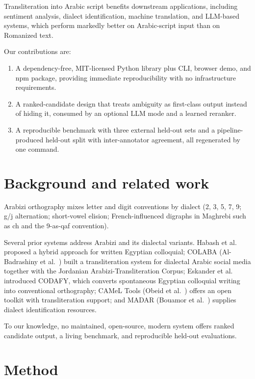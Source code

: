 \documentclass[11pt]{article}
\begin{document}
Transliteration into Arabic script benefits downstream applications,
including sentiment analysis, dialect identification, machine
translation, and LLM-based systems, which perform markedly better on
Arabic-script input than on Romanized text.

Our contributions are:

\begin{enumerate}
  \item A dependency-free, MIT-licensed Python library plus CLI, browser
        demo, and npm package, providing immediate reproducibility with
        no infrastructure requirements.
  \item A ranked-candidate design that treats ambiguity as first-class
        output instead of hiding it, consumed by an optional LLM mode and
        a learned reranker.
  \item A reproducible benchmark with three external held-out sets and a
        pipeline-produced held-out split with inter-annotator agreement,
        all regenerated by one command.
\end{enumerate}

\section{Background and related work}
\label{sec:related}

Arabizi orthography mixes letter and digit conventions by dialect
(2, 3, 5, 7, 9; g/j alternation; short-vowel elision; French-influenced
digraphs in Maghrebi such as ch and the 9-as-qaf convention).

Several prior systems address Arabizi and its dialectal variants.
Habash et al.~\cite{habash2012} proposed a hybrid approach for written
Egyptian colloquial; COLABA (Al-Badrashiny et al.~\cite{albadrashiny2014})
built a transliteration system for dialectal Arabic social media
together with the Jordanian Arabizi-Transliteration Corpus; Eskander
et al.~\cite{eskander2013} introduced CODAFY, which converts spontaneous
Egyptian colloquial writing into conventional orthography; CAMeL Tools
(Obeid et al.~\cite{obeid2020}) offers an open toolkit with
transliteration support; and MADAR (Bouamor et al.~\cite{bouamor2018})
supplies dialect identification resources.

To our knowledge, no maintained, open-source, modern system offers ranked
candidate output, a living benchmark, and reproducible held-out
evaluations.

\section{Method}
\label{sec:method}
\end{document}
